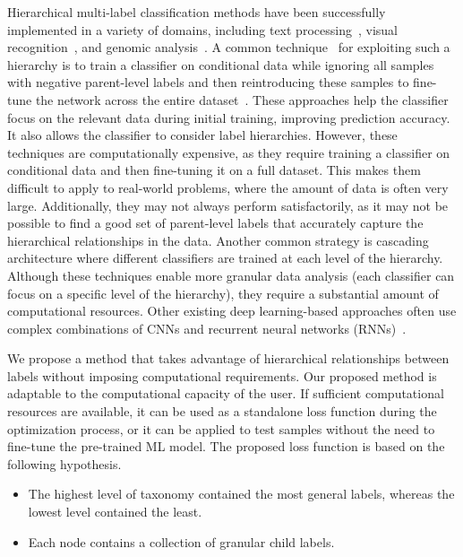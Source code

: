 Hierarchical multi-label classification methods have been successfully implemented in a variety of domains, including text processing~\cite{aly_Hierarchical_2019}, visual recognition~\cite{bi_Mandatory_2014}, and genomic analysis~\cite{bi_BayesOptimal_2015}. A common technique~\cite{chen_Deep_2019} for exploiting such a hierarchy is to train a classifier on conditional data while ignoring all samples with negative parent-level labels and then reintroducing these samples to fine-tune the network across the entire dataset~\cite{chen_Deep_2019}. These approaches help the classifier focus on the relevant data during initial training, improving prediction accuracy. It also allows the classifier to consider label hierarchies. However, these techniques are computationally expensive, as they require training a classifier on conditional data and then fine-tuning it on a full dataset. This makes them difficult to apply to real-world problems, where the amount of data is often very large. Additionally, they may not always perform satisfactorily, as it may not be possible to find a good set of parent-level labels that accurately capture the hierarchical relationships in the data. Another common strategy is cascading architecture where different classifiers are trained at each level of the hierarchy. Although these techniques enable more granular data analysis (each classifier can focus on a specific level of the hierarchy), they require a substantial amount of computational resources. Other existing deep learning-based approaches often use complex combinations of CNNs and recurrent neural networks (RNNs)~\cite{guo_CNNRNN_2018,kowsari_HDLTex_2017}.

We propose a method that takes advantage of hierarchical relationships between labels without imposing computational requirements. Our proposed method is adaptable to the computational capacity of the user. If sufficient computational resources are available, it can be used as a standalone loss function during the optimization process, or it can be applied to test samples without the need to fine-tune the pre-trained ML model. The proposed loss function is based on the following hypothesis.

\begin{itemize}
    \item  The highest level of taxonomy contained the most general labels, whereas the lowest level contained the least.
    \item  Each node contains a collection of granular child labels.
\end{itemize}


